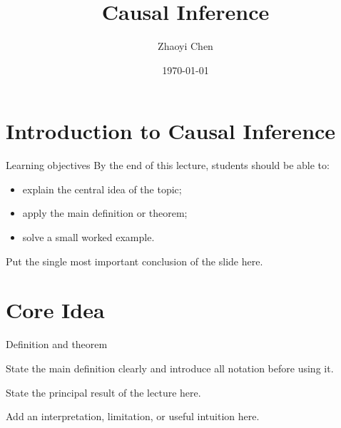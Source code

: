 \documentclass[11pt,aspectratio=169]{beamer}
\title[Causal Inference]{Causal Inference}
\subtitle{}
\author[Zhaoyi Chen]{Zhaoyi Chen}
\date{\today}
\begin{document}
\begin{titleframe}


\end{titleframe}

\begin{outlineframe}

\end{outlineframe}

\section{Introduction to Causal Inference}

\begin{theoryframe}{Learning objectives}
  By the end of this lecture, students should be able to:

  \begin{itemize}
    \item explain the central idea of the topic;
    \item apply the main definition or theorem;
    \item solve a small worked example.
  \end{itemize}

  \begin{importantbox}
    Put the single most important conclusion of the slide here.
  \end{importantbox}
\end{theoryframe}

\section{Core Idea}

\begin{theoryframe}{Definition and theorem}
  \begin{definitionbox}[Definition]
    State the main definition clearly and introduce all notation before using it.
  \end{definitionbox}

  \pause

  \begin{theorembox}
    State the principal result of the lecture here.
  \end{theorembox}

  \begin{remarkbox}
    Add an interpretation, limitation, or useful intuition here.
  \end{remarkbox}
\end{theoryframe}
\end{document}
